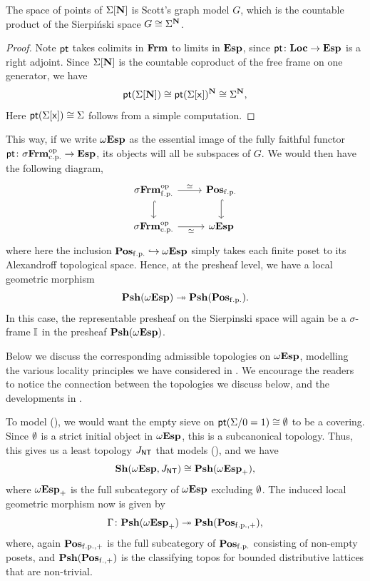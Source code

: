 \begin{lemma}
  The space of points of $\Sigma[\mathbf{N}]$ is Scott's graph model $G$, which is the countable product of the Sierpi\'nski space $G \cong \Sigma^{\mathbf{N}}$.
\end{lemma}
\begin{proof}
  Note $\mathsf{pt}$ takes colimits in $\mathbf{Frm}$ to limits in $\mathbf{Esp}$, since $\mathsf{pt} \colon \mathbf{Loc} \to \mathbf{Esp}$ is a right adjoint. Since $\Sigma[\mathbf{N}]$ is the countable coproduct of the free frame on one generator, we have
  \[ \pt(\Sigma[\N]) \cong \pt(\Sigma[\ms{x}])^\N \cong \Sigma^\N\text{,} \]
  Here $\mathsf{pt}(\Sigma[\mathsf{x}]) \cong \Sigma$ follows from a simple computation.
\end{proof}

This way, if we write $\omega\mathbf{Esp}$ as the essential image of the fully faithful functor $\mathsf{pt} \colon \sigma\mathbf{Frm}_{\mathrm{c.p.}}^{\mathrm{op}} \to \mathbf{Esp}$, its objects will all be subspaces of $G$. We would then have the following diagram,
\[
\begin{tikzcd}
  \sFrm\fp\op \ar[d, hook] \ar[r, "\simeq"] & \Pos\fp \ar[d, hook] \\
  \sFrm\cp\op \ar[r, "\simeq"'] & \wTop
\end{tikzcd}
\]
where here the inclusion $\mathbf{Pos}_{\mathrm{f.p.}} \hookrightarrow \omega\mathbf{Esp}$ simply takes each finite poset to its Alexandroff topological space. Hence, at the presheaf level, we have a local geometric morphism
\[ \psh(\wTop) \surj \psh(\Pos\fp)\text{.} \]
In this case, the representable presheaf on the Sierpinski space will again be a $\sigma$-frame $\mathbb{I}$ in the presheaf $\mathbf{Psh}(\omega\mathbf{Esp})$.

Below we discuss the corresponding admissible topologies on $\omega\mathbf{Esp}$, modelling the various locality principles we have considered in . We encourage the readers to notice the connection between the topologies we discuss below, and the developments in .

\begin{example}[\AxiomNT]
  To model (\AxiomNT), we would want the empty sieve on $\mathsf{pt}(\Sigma/0=1) \cong \emptyset$ to be a covering. Since $\emptyset$ is a strict initial object in $\omega\mathbf{Esp}$, this is a subcanonical topology. Thus, this gives us a least topology $J_{\mathsf{NT}}$ that models (\AxiomNT), and we have
  \[ \sh(\wTop,J_{\ms{NT}}) \cong \psh(\wTop_+)\text{,} \]
  where $\omega\mathbf{Esp}_+$ is the full subcategory of $\omega\mathbf{Esp}$ excluding $\emptyset$. The induced local geometric morphism now is given by 
  \[ \Gamma \colon \psh(\wTop_+) \surj \psh(\Pos_{\mr{f.p.,+}})\text{,} \]
  where, again $\mathbf{Pos}_{\mathrm{f.p.,+}}$ is the full subcategory of $\mathbf{Pos}_{\mathrm{f.p.}}$ consisting of non-empty posets, and $\mathbf{Psh}(\mathbf{Pos}_{\mathrm{f.,+}})$ is the classifying topos for bounded distributive lattices that are non-trivial.
\end{example}

